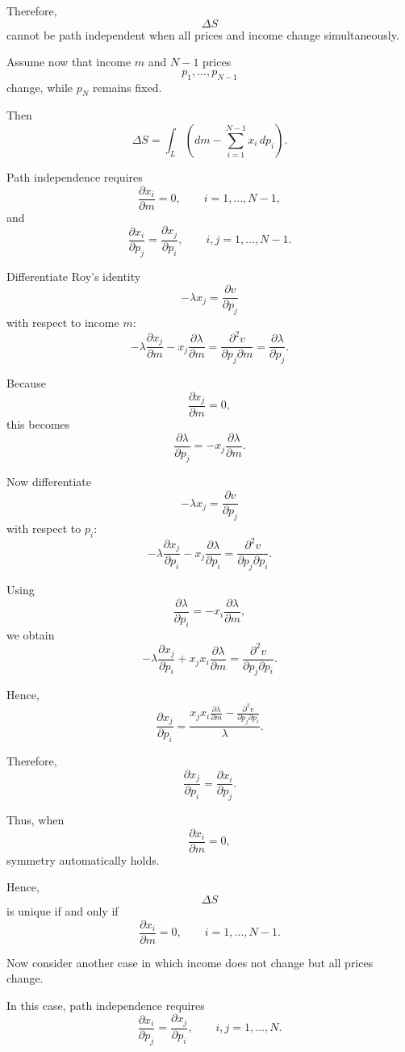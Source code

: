 Therefore,
\[
\Delta S
\]
cannot be path independent when all prices and income change simultaneously.

Assume now that income \(m\) and \(N-1\) prices
\[
p_1,\dots,p_{N-1}
\]
change, while \(p_N\) remains fixed.

Then
\[
\Delta S
=
\int_L
\left(
dm-\sum_{i=1}^{N-1}x_i\,dp_i
\right).
\]

Path independence requires
\[
\frac{\partial x_i}{\partial m}
=
0,
\qquad
i=1,\dots,N-1,
\]
and
\[
\frac{\partial x_i}{\partial p_j}
=
\frac{\partial x_j}{\partial p_i},
\qquad
i,j=1,\dots,N-1.
\]

Differentiate Roy's identity
\[
-\lambda x_j
=
\frac{\partial v}{\partial p_j}
\]
with respect to income \(m\):
\[
-\lambda\frac{\partial x_j}{\partial m}
-
x_j\frac{\partial \lambda}{\partial m}
=
\frac{\partial^2 v}{\partial p_j\partial m}
=
\frac{\partial \lambda}{\partial p_j}.
\]

Because
\[
\frac{\partial x_j}{\partial m}=0,
\]
this becomes
\[
\frac{\partial \lambda}{\partial p_j}
=
-
x_j\frac{\partial \lambda}{\partial m}.
\]

Now differentiate
\[
-\lambda x_j
=
\frac{\partial v}{\partial p_j}
\]
with respect to \(p_i\):
\[
-\lambda\frac{\partial x_j}{\partial p_i}
-
x_j\frac{\partial \lambda}{\partial p_i}
=
\frac{\partial^2 v}{\partial p_j\partial p_i}.
\]

Using
\[
\frac{\partial \lambda}{\partial p_i}
=
-
x_i\frac{\partial \lambda}{\partial m},
\]
we obtain
\[
-\lambda\frac{\partial x_j}{\partial p_i}
+
x_jx_i\frac{\partial \lambda}{\partial m}
=
\frac{\partial^2 v}{\partial p_j\partial p_i}.
\]

Hence,
\[
\frac{\partial x_j}{\partial p_i}
=
\frac{
x_jx_i\frac{\partial \lambda}{\partial m}
-
\frac{\partial^2 v}{\partial p_j\partial p_i}
}{\lambda}.
\]

Therefore,
\[
\frac{\partial x_j}{\partial p_i}
=
\frac{\partial x_i}{\partial p_j}.
\]

Thus, when
\[
\frac{\partial x_i}{\partial m}=0,
\]
symmetry automatically holds.

Hence,
\[
\Delta S
\]
is unique if and only if
\[
\frac{\partial x_i}{\partial m}=0,
\qquad
i=1,\dots,N-1.
\]

Now consider another case in which income does not change but all prices change.

In this case, path independence requires
\[
\frac{\partial x_i}{\partial p_j}
=
\frac{\partial x_j}{\partial p_i},
\qquad
i,j=1,\dots,N.
\]

